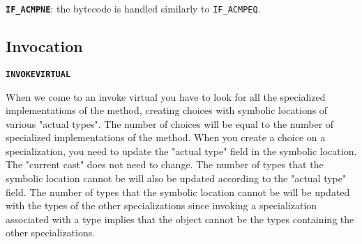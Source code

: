 \noindent \textbf{\texttt{IF\_ACMPNE}}: the bytecode is handled similarly to \texttt{IF\_ACMPEQ}. 

\subsection{Invocation}
\textbf{\texttt{INVOKEVIRTUAL}}

When we come to an invoke virtual you have to look for all the specialized implementations
of the method, creating choices with symbolic locations of various "actual types". The number
of choices will be equal to the number of specialized implementations of the method. When you create a choice on a specialization, you need to update the "actual type" field in the symbolic location. The "current cast" does not need to change. The number of types that the symbolic location cannot be will also be updated according to the "actual type" field. The number of types that the symbolic location cannot be will be updated with the types of the other specializations since invoking a specialization associated with a type implies that the object cannot be the types containing the other specializations.

